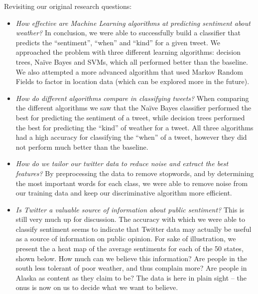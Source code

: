 	Revisiting our original research questions:

\begin{itemize}
	\item \emph{How effective are Machine Learning algorithms at predicting sentiment about weather?}
		In conclusion, we were able to successfully build a classifier that predicts the “sentiment”, “when” and “kind” for a given tweet. We approached the problem with three different learning algorithms: decision trees, Naïve Bayes and SVMs, which all performed better than the baseline. We also attempted a more advanced algorithm that used Markov Random Fields to factor in location data (which can be explored more in the future). 
	\item \emph{How do different algorithms compare in classifying tweets?}
	When comparing the different algorithms we saw that the Naïve Bayes classifier performed the best for predicting the sentiment of a tweet, while decision trees performed the best for predicting the “kind” of weather for a tweet. All three algorithms had a high accuracy for classifying the “when” of a tweet, however they did not perform much better than the baseline.
	\item \emph{How do we tailor our twitter data to reduce noise and extract the best features?}
	By preprocessing the data to remove stopwords, and by determining the most important words for each class, we were able to remove noise from our training data and keep our discriminative algorithm more efficient.
	\item \emph{Is Twitter a valuable source of information about public sentiment?}
	This is still very much up for discussion. The accuracy with which we were able to classify sentiment seems to indicate that Twitter data may actually be useful as a source of information on public opinion. For sake of illustration, we present the a heat map of the average sentiments for each of the 50 states, shown below. How much can we believe this information? Are people in the south less tolerant of poor weather, and thus complain more? Are people in Alaska as content as they claim to be? The data is here in plain sight -- the onus is now on us to decide what we want to believe. 
\end{itemize}

\begin{figure}[!htb]
\noindent{}
\end{figure}